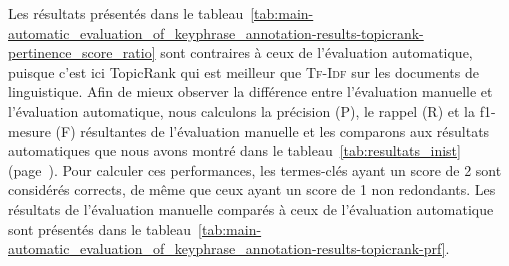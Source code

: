         Les résultats présentés dans le
        tableau~\ref{tab:main-automatic_evaluation_of_keyphrase_annotation-results-topicrank-pertinence_score_ratio}
        sont contraires à ceux de l'évaluation automatique, puisque c'est ici
        TopicRank qui est meilleur que \textsc{Tf-Idf} sur les documents de
        linguistique. Afin de mieux observer la différence entre l'évaluation
        manuelle et l'évaluation automatique, nous calculons la précision (P),
        le rappel (R) et la f1-mesure (F) résultantes de l'évaluation
        manuelle et les comparons aux résultats automatiques que nous avons
        montré dans le tableau~\ref{tab:resultats_inist}
        (page~\pageref{tab:resultats_inist}). Pour calculer ces performances,
        les termes-clés ayant un score de 2 sont considérés corrects, de même
        que ceux ayant un score de 1 non redondants. Les résultats de
        l'évaluation manuelle comparés à ceux de l'évaluation automatique sont
        présentés dans le
        tableau~\ref{tab:main-automatic_evaluation_of_keyphrase_annotation-results-topicrank-prf}.
        
